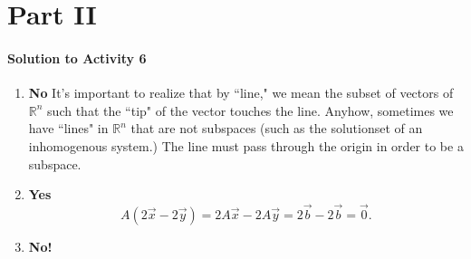 \section{Part II}

\paragraph{Solution to Activity 6}
\begin{enumerate}
	\item \textbf{No} It's important to realize that by ``line," we mean the subset of vectors of \(\mathbb{R}^n\) such that the ``tip" of the vector touches the line.
				  Anyhow, sometimes we have ``lines" in \(\mathbb{R}^n\) that are not subspaces (such as the solutionset of an inhomogenous system.) The line
				  must pass through the origin in order to be a subspace.
	\item \textbf{Yes} \[A(2\vec{x} - 2\vec{y}) = 2A\vec{x} - 2A\vec{y} = 2\vec{b} - 2\vec{b} = \vec{0}.\]
	\item \textbf{No!}
\end{enumerate}

